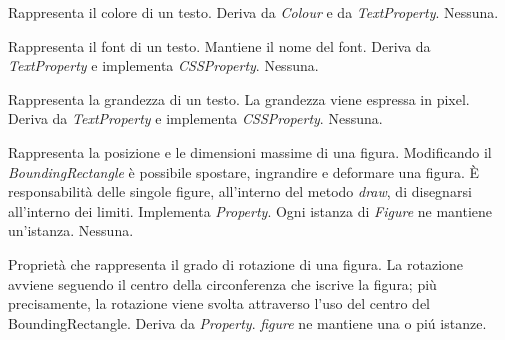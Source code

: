 Rappresenta il colore di un testo.
Deriva da \textit{Colour} e da \textit{TextProperty}.
Nessuna.

Rappresenta il font di un testo. Mantiene il nome del font.
Deriva da \textit{TextProperty} e implementa \textit{CSSProperty}.
Nessuna.

Rappresenta la grandezza di un testo. La grandezza viene espressa in pixel.
Deriva da \textit{TextProperty} e implementa \textit{CSSProperty}.
Nessuna.

Rappresenta la posizione e le dimensioni massime di una figura. Modificando il
\textit{BoundingRectangle} \`e possibile spostare, ingrandire e deformare una figura.
\`E responsabilit\`a delle singole figure, all'interno del metodo \textit{draw}, di disegnarsi all'interno dei limiti.
Implementa \textit{Property}. Ogni istanza di \textit{Figure} ne mantiene un'istanza.
Nessuna.

Propriet\`a che rappresenta il grado di rotazione di una figura. La rotazione avviene seguendo il centro della circonferenza che iscrive la figura; pi\`u precisamente, la rotazione viene svolta attraverso l'uso del centro del BoundingRectangle. 
Deriva da \textit{Property}.
\textit{figure} ne mantiene una o pi\'u istanze.

